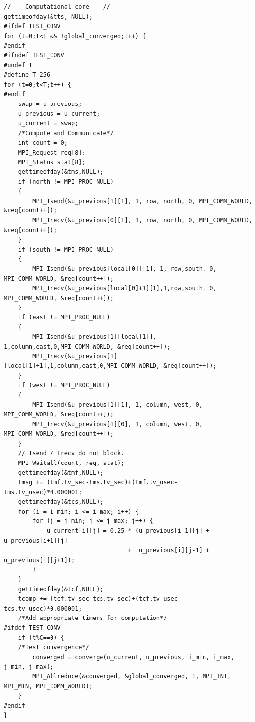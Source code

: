 \documentclass{article}
\begin{document}
\begin{lstlisting}[caption={Jacobi MPI core}, style=CStyle, label={lst:mpi-jacobi-core}]
//----Computational core----//   
gettimeofday(&tts, NULL);
#ifdef TEST_CONV
for (t=0;t<T && !global_converged;t++) {
#endif
#ifndef TEST_CONV
#undef T
#define T 256
for (t=0;t<T;t++) {
#endif
    swap = u_previous;
    u_previous = u_current;
    u_current = swap;
    /*Compute and Communicate*/
    int count = 0;
    MPI_Request req[8];
    MPI_Status stat[8];
    gettimeofday(&tms,NULL);
    if (north != MPI_PROC_NULL)
    {
        MPI_Isend(&u_previous[1][1], 1, row, north, 0, MPI_COMM_WORLD, &req[count++]);
        MPI_Irecv(&u_previous[0][1], 1, row, north, 0, MPI_COMM_WORLD, &req[count++]);
    }
    if (south != MPI_PROC_NULL)
    {
        MPI_Isend(&u_previous[local[0]][1], 1, row,south, 0, MPI_COMM_WORLD, &req[count++]);
        MPI_Irecv(&u_previous[local[0]+1][1],1,row,south, 0, MPI_COMM_WORLD, &req[count++]);
    }
    if (east != MPI_PROC_NULL)
    {
        MPI_Isend(&u_previous[1][local[1]], 1,column,east,0,MPI_COMM_WORLD, &req[count++]);
        MPI_Irecv(&u_previous[1][local[1]+1],1,column,east,0,MPI_COMM_WORLD, &req[count++]);
    }
    if (west != MPI_PROC_NULL)
    {
        MPI_Isend(&u_previous[1][1], 1, column, west, 0, MPI_COMM_WORLD, &req[count++]);
        MPI_Irecv(&u_previous[1][0], 1, column, west, 0, MPI_COMM_WORLD, &req[count++]);
    }
    // Isend / Irecv do not block.
    MPI_Waitall(count, req, stat);
    gettimeofday(&tmf,NULL);
    tmsg += (tmf.tv_sec-tms.tv_sec)+(tmf.tv_usec-tms.tv_usec)*0.000001;
    gettimeofday(&tcs,NULL);
    for (i = i_min; i <= i_max; i++) {
        for (j = j_min; j <= j_max; j++) {
            u_current[i][j] = 0.25 * (u_previous[i-1][j] + u_previous[i+1][j]
                                   +  u_previous[i][j-1] + u_previous[i][j+1]);
        }
    }
    gettimeofday(&tcf,NULL);
    tcomp += (tcf.tv_sec-tcs.tv_sec)+(tcf.tv_usec-tcs.tv_usec)*0.000001;
    /*Add appropriate timers for computation*/
#ifdef TEST_CONV
    if (t%C==0) {
    /*Test convergence*/
        converged = converge(u_current, u_previous, i_min, i_max, j_min, j_max);
        MPI_Allreduce(&converged, &global_converged, 1, MPI_INT, MPI_MIN, MPI_COMM_WORLD);
    }
#endif
}
\end{lstlisting}
\end{document}
